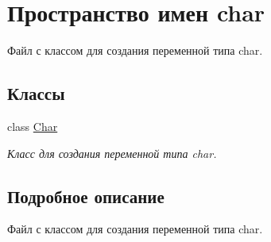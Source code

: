 \hypertarget{namespacechar}{}\section{Пространство имен char}
\label{namespacechar}


Файл с классом для создания переменной типа char.  


\subsection*{Классы}
\begin{DoxyCompactItemize}
\item 
class \mbox{\hyperlink{classchar_1_1_char}{Char}}
\begin{DoxyCompactList}\small\item\em Класс для создания переменной типа char. \end{DoxyCompactList}\end{DoxyCompactItemize}


\subsection{Подробное описание}
Файл с классом для создания переменной типа char. 

